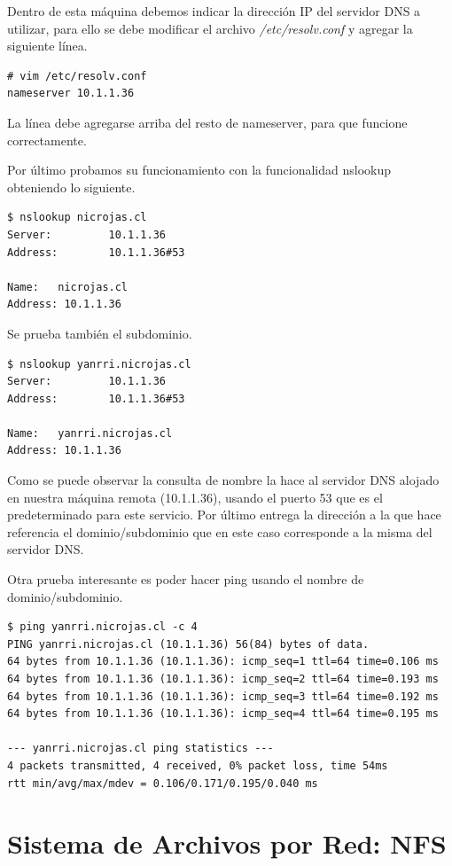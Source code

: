 \documentclass[12pt]{article}
\begin{document}
Dentro de esta máquina debemos indicar la dirección IP del servidor DNS a utilizar, para ello se debe modificar el archivo \emph{/etc/resolv.conf} y agregar la siguiente línea.

\begin{lstlisting}[frame=single]
# vim /etc/resolv.conf
nameserver 10.1.1.36 
\end{lstlisting}

La línea debe agregarse arriba del resto de nameserver, para que funcione correctamente.

Por último probamos su funcionamiento con la funcionalidad nslookup obteniendo lo siguiente.
\begin{lstlisting}[frame=single]
$ nslookup nicrojas.cl
Server:         10.1.1.36
Address:        10.1.1.36#53

Name:   nicrojas.cl
Address: 10.1.1.36
\end{lstlisting}

Se prueba también el subdominio.
 \begin{lstlisting}[frame=single]
$ nslookup yanrri.nicrojas.cl
Server:         10.1.1.36
Address:        10.1.1.36#53

Name:   yanrri.nicrojas.cl
Address: 10.1.1.36
\end{lstlisting}

Como se puede observar la consulta de nombre la hace al servidor DNS alojado en nuestra máquina remota (10.1.1.36), usando el puerto 53 que es el predeterminado para este servicio. Por último entrega la dirección a la que hace referencia el dominio/subdominio que en este caso corresponde a la misma del servidor DNS.

Otra prueba interesante es poder hacer ping usando el nombre de dominio/subdominio.
 \begin{lstlisting}[frame=single]
$ ping yanrri.nicrojas.cl -c 4
PING yanrri.nicrojas.cl (10.1.1.36) 56(84) bytes of data.
64 bytes from 10.1.1.36 (10.1.1.36): icmp_seq=1 ttl=64 time=0.106 ms
64 bytes from 10.1.1.36 (10.1.1.36): icmp_seq=2 ttl=64 time=0.193 ms
64 bytes from 10.1.1.36 (10.1.1.36): icmp_seq=3 ttl=64 time=0.192 ms
64 bytes from 10.1.1.36 (10.1.1.36): icmp_seq=4 ttl=64 time=0.195 ms

--- yanrri.nicrojas.cl ping statistics ---
4 packets transmitted, 4 received, 0% packet loss, time 54ms
rtt min/avg/max/mdev = 0.106/0.171/0.195/0.040 ms
\end{lstlisting}

\section{Sistema de Archivos por Red: NFS}
\end{document}
